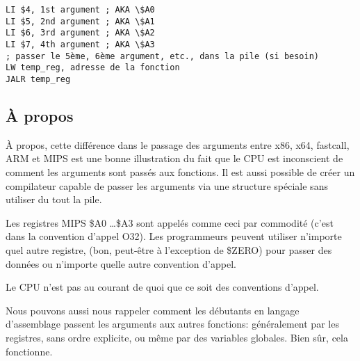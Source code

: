 \begin{lstlisting}[caption=MIPS (O32 calling convention),style=customasmMIPS]
LI $4, 1st argument ; AKA \$A0
LI $5, 2nd argument ; AKA \$A1
LI $6, 3rd argument ; AKA \$A2
LI $7, 4th argument ; AKA \$A3
; passer le 5ème, 6ème argument, etc., dans la pile (si besoin)
LW temp_reg, adresse de la fonction
JALR temp_reg
\end{lstlisting}

\subsection{À propos}

À propos, cette différence dans le passage des arguments entre x86, x64, fastcall, ARM
et MIPS est une bonne illustration du fait que le CPU est inconscient de comment
les arguments sont passés aux fonctions.
Il est aussi possible de créer un compilateur capable de passer les
arguments via une structure spéciale sans utiliser du tout la pile.

Les registres MIPS \$A0 \dots \$A3 sont appelés comme ceci par commodité (c'est
dans la convention d'appel O32).
Les programmeurs peuvent utiliser n'importe quel autre registre, (bon, peut-être
à l'exception de \$ZERO) pour passer des données ou n'importe quelle autre convention d'appel.

Le \ac{CPU} n'est pas au courant de quoi que ce soit des conventions d'appel.

Nous pouvons aussi nous rappeler comment les débutants en langage d'assemblage passent
les arguments aux autres fonctions: généralement par les registres, sans ordre explicite,
ou même par des variables globales.
Bien sûr, cela fonctionne.

